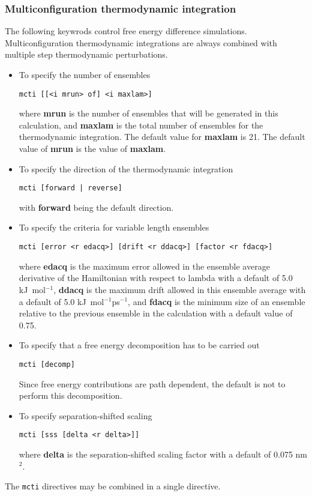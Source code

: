 \subsubsection{Multiconfiguration thermodynamic integration}
The following keywrods control free energy difference simulations.
Multiconfiguration thermodynamic integrations are always combined
with multiple step thermodynamic perturbations.
\begin{itemize}
\item
To specify the number of ensembles
\begin{verbatim}
mcti [[<i mrun> of] <i maxlam>] 
\end{verbatim}
where {\bf mrun} is the number of ensembles that will be generated in
this calculation, and {\bf maxlam} is the total number of ensembles
for the thermodynamic integration. The default value for {\bf maxlam}
is 21. The default value of {\bf mrun} is the value of {\bf maxlam}.
\item
To specify the direction of the thermodynamic integration
\begin{verbatim}
mcti [forward | reverse] 
\end{verbatim}
with {\bf forward} being the default direction.
\item
To specify the criteria for variable length ensembles
\begin{verbatim}
mcti [error <r edacq>] [drift <r ddacq>] [factor <r fdacq>]
\end{verbatim}
where {\bf edacq} is the maximum error allowed in the ensemble average 
derivative of the Hamiltonian with respect to lambda with a default
of 5.0 kJ~mol$^{-1}$, {\bf ddacq} is the maximum drift allowed in this
ensemble average with a default of 5.0 kJ~mol$^{-1}$ps$^{-1}$, and
{\bf fdacq} is the minimum size of an ensemble relative to the
previous ensemble in the calculation with a default value of 0.75.
\item
To specify that a free energy decomposition has to be carried out
\begin{verbatim}
mcti [decomp]
\end{verbatim}
Since free energy contributions are path dependent, the default is not
to perform this decomposition.
\item
To specify separation-shifted scaling
\begin{verbatim}
mcti [sss [delta <r delta>]]
\end{verbatim}
where {\bf delta} is the separation-shifted scaling factor with a default
of 0.075 nm$^2$.
\end{itemize}
The \verb+mcti+ directives may be combined in a single directive.

